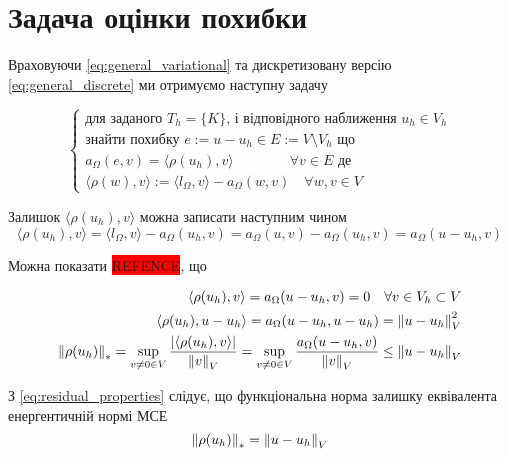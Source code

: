 
\section{Задача оцінки похибки}

Враховуючи
\eqref{eq:general_variational} та дискретизовану версію
\eqref{eq:general_discrete} ми отримуємо наступну задачу

\begin{equation}\label{eq:AE_problem}
	\begin{cases}
		\mbox{для заданого } T_h=\{K\} \text{, і відповідного наближення } u_h \in V_h \\
		\text{знайти похибку } e:=u-u_h \in E := V \setminus V_h \text{ що} \\
		a_\Omega(e,v) = \langle\rho(u_h), v\rangle \qquad \qquad \forall v \in E \text{ де}\\
		\langle\rho(w), v\rangle := \langle l_\Omega, v\rangle - a_\Omega(w, v) \quad \forall w,v \in V
	\end{cases}
\end{equation}

Залишок $\langle\rho(u_h), v\rangle$ можна записати наступним чином
\begin{equation*}
	\langle\rho(u_h), v\rangle
		= \langle l_\Omega, v\rangle - a_\Omega(u_h, v)
		= a_\Omega(u,v)-a_\Omega(u_h, v) = a_\Omega(u-u_h, v)
\end{equation*}

Можна показати \colorbox{red}{REFENCE}, що

\begin{equation}\label{eq:residual_properties}
	\begin{split}
		\langle\rho(u_h), v\rangle = a_\Omega(u-u_h, v) = 0 \quad \forall v \in V_h \subset V \\
		\langle\rho(u_h), u-u_h\rangle = a_\Omega(u-u_h, u-u_h) = \left\lVert u-u_h\right\rVert^2_V \\
		\left\lVert\rho(u_h)\right\rVert_* = \sup \limits_{v \ne 0 \in V} \frac{|\langle\rho(u_h), v\rangle|}{\left\lVert v\right\rVert_V} =
			\sup \limits_{v \ne 0 \in V} \frac{a_\Omega(u-u_h, v)}{\left\lVert v\right\rVert_V} \le \left\lVert u-u_h\right\rVert_V
	\end{split}
\end{equation}

З
\eqref{eq:residual_properties} слідує, що функціональна норма залишку еквівалента енергентичній нормі МСЕ
\begin{equation}
	\left\lVert\rho(u_h)\right\rVert_* = \left\lVert u-u_h\right\rVert_V
\end{equation}


